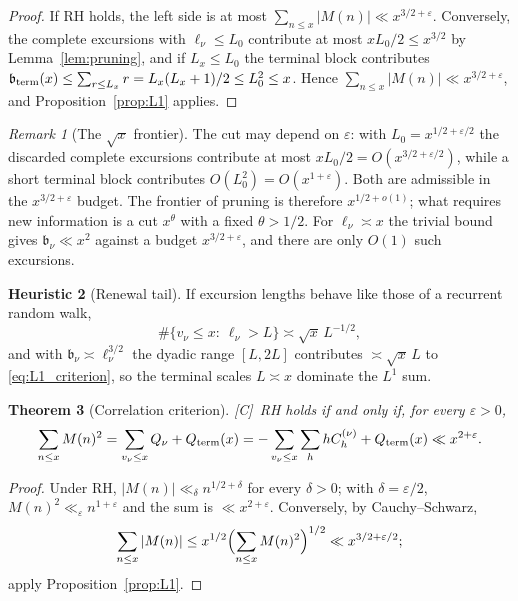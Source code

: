 \documentclass[11pt,reqno]{amsart}
\numberwithin{equation}{section}
\theoremstyle{plain}
\newtheorem{theorem}{Theorem}[section]
\theoremstyle{definition}
\newtheorem{heuristic}[theorem]{Heuristic}
\theoremstyle{remark}
\newtheorem{remark}[theorem]{Remark}
\newcommand{\eps}{\varepsilon}
\newcommand{\tagC}{\textup{[C]}}
\begin{document}
\begin{proof}
If RH holds, the left side is at most $\sum_{n\le x}|M(n)|\ll x^{3/2+\eps}$.
Conversely, the complete excursions with $\ell_\nu\le L_0$ contribute at
most $xL_0/2\le x^{3/2}$ by Lemma~\ref{lem:pruning}, and if $L_x\le L_0$
the terminal block contributes
$\mathfrak b_{\rm term}(x)\le\sum_{r\le L_x}r=L_x(L_x+1)/2\le L_0^2\le x$.
Hence $\sum_{n\le x}|M(n)|\ll x^{3/2+\eps}$, and
Proposition~\ref{prop:L1} applies.
\end{proof}

\begin{remark}[The $\sqrt{x}$ frontier]
\label{rem:sqrt_frontier}
The cut may depend on $\eps$: with $L_0=x^{1/2+\eps/2}$ the discarded
complete excursions contribute at most $xL_0/2=O(x^{3/2+\eps/2})$, while a
short terminal block contributes
$O(L_0^2)=O(x^{1+\eps})$.  Both are admissible in the
$x^{3/2+\eps}$ budget.  The frontier of pruning is therefore
$x^{1/2+o(1)}$;
what requires new information is a cut $x^{\theta}$ with a fixed
$\theta>1/2$. For $\ell_\nu\asymp x$ the trivial bound gives
$\mathfrak b_\nu\ll x^2$ against a budget $x^{3/2+\eps}$, and there are only
$O(1)$ such excursions.
\end{remark}

\begin{heuristic}[Renewal tail]
\label{heu:renewal}
If excursion lengths behave like those of a recurrent random walk,
\begin{equation}
\label{eq:renewal_tail}
  \#\{v_\nu\le x:\ \ell_\nu>L\}\asymp\sqrt{x}\,L^{-1/2},
\end{equation}
and with $\mathfrak b_\nu\asymp\ell_\nu^{3/2}$ the dyadic range $[L,2L]$
contributes $\asymp\sqrt{x}\,L$ to \eqref{eq:L1_criterion}, so the terminal
scales $L\asymp x$ dominate the $L^1$ sum.
\end{heuristic}

\begin{theorem}[Correlation criterion]
\label{thm:corr-criterion}
\tagC\ RH holds if and only if, for every $\eps>0$,
\begin{equation}
\label{eq:RH-corr}
  \sum_{n\le x}M(n)^2=\sum_{v_\nu\le x}Q_\nu+Q_{\rm term}(x)
  =-\sum_{v_\nu\le x}\sum_{h}hC^{(\nu)}_h+Q_{\rm term}(x)\ll x^{2+\eps}.
\end{equation}
\end{theorem}

\begin{proof}
Under RH, $|M(n)|\ll_\delta n^{1/2+\delta}$ for every $\delta>0$; with
$\delta=\eps/2$, $M(n)^2\ll_\eps n^{1+\eps}$ and the sum is $\ll x^{2+\eps}$.
Conversely, by Cauchy--Schwarz,
\begin{equation}
\sum_{n\le x}|M(n)|\le x^{1/2}\Bigl(\sum_{n\le x}M(n)^2\Bigr)^{1/2}\ll x^{3/2+\eps/2};
\end{equation}
apply
Proposition~\ref{prop:L1}.
\end{proof}
\end{document}

